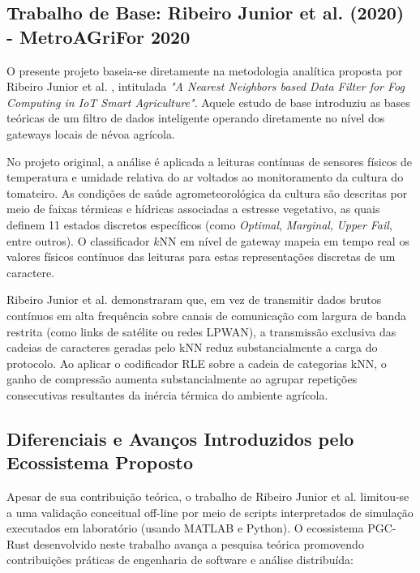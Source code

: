 \documentclass[
	12pt,
	openright,
	oneside,
	a4paper,
	english,
	brazil
	]{abntex2}
\begin{document}
\subsection{Trabalho de Base: Ribeiro Junior et al. (2020) - MetroAGriFor 2020}

O presente projeto baseia-se diretamente na metodologia analítica proposta por Ribeiro Junior et al. \cite{ribeiro2020nearest}, intitulada \textit{"A Nearest Neighbors based Data Filter for Fog Computing in IoT Smart Agriculture"}. Aquele estudo de base introduziu as bases teóricas de um filtro de dados inteligente operando diretamente no nível dos gateways locais de névoa agrícola.

No projeto original, a análise é aplicada a leituras contínuas de sensores físicos de temperatura e umidade relativa do ar voltados ao monitoramento da cultura do tomateiro. As condições de saúde agrometeorológica da cultura são descritas por meio de faixas térmicas e hídricas associadas a estresse vegetativo, as quais definem 11 estados discretos específicos (como \textit{Optimal}, \textit{Marginal}, \textit{Upper Fail}, entre outros). O classificador $k$NN em nível de gateway mapeia em tempo real os valores físicos contínuos das leituras para estas representações discretas de um caractere.

Ribeiro Junior et al. demonstraram que, em vez de transmitir dados brutos contínuos em alta frequência sobre canais de comunicação com largura de banda restrita (como links de satélite ou redes LPWAN), a transmissão exclusiva das cadeias de caracteres geradas pelo kNN reduz substancialmente a carga do protocolo. Ao aplicar o codificador RLE sobre a cadeia de categorias kNN, o ganho de compressão aumenta substancialmente ao agrupar repetições consecutivas resultantes da inércia térmica do ambiente agrícola.

\subsection{Diferenciais e Avanços Introduzidos pelo Ecossistema Proposto}

Apesar de sua contribuição teórica, o trabalho de Ribeiro Junior et al. \cite{ribeiro2020nearest} limitou-se a uma validação conceitual off-line por meio de scripts interpretados de simulação executados em laboratório (usando MATLAB e Python). O ecossistema PGC-Rust desenvolvido neste trabalho avança a pesquisa teórica promovendo contribuições práticas de engenharia de software e análise distribuída:
\end{document}
